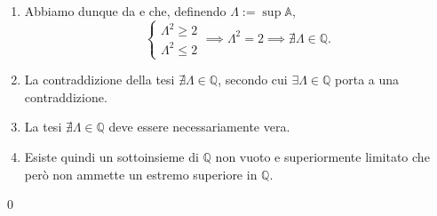 \begin{enumerate}
\begin{demonstration}
\begin{enumerate}[label=(\roman*)]
\begin{enumerate}[label=\arabic*.]
            \end{enumerate}
            \qed

            \item Abbiamo dunque da  e  che,
            definendo $\Lambda:=\sup\mathbb{A}$,
            \[
                \begin{cases}
                    \Lambda^2 \geq 2 \\
                    \Lambda^2 \leq 2
                \end{cases}\implies \Lambda^2 = 2 \implies \nexists \Lambda \in \mathbb{Q}.
            \]

            \item La contraddizione della tesi $\nexists \Lambda \in \mathbb{Q}$, secondo cui
                $\exists \Lambda \in \mathbb{Q}$ porta a una contraddizione.

            \item La tesi $\nexists \Lambda \in \mathbb{Q}$ deve essere necessariamente vera.
            
            \item Esiste quindi un sottoinsieme di $\mathbb{Q}$ non vuoto e superiormente limitato che però non
                ammette un estremo superiore in $\mathbb{Q}$.

        \end{enumerate}
        \qed
    \end{demonstration}

\end{enumerate}